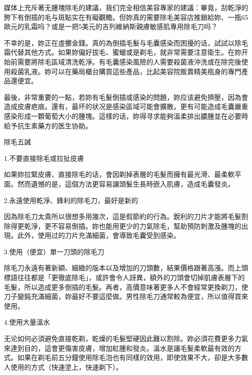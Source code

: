 \documentclass[12pt,UTF8]{ctexbook}
\begin{document}
媒体上充斥著无腫塊除毛的建議，我们完全相信美容專家的建議：畢竟，刮乾淨的胯下有倒插的毛与斑點实在有礙觀瞻。但妳真的需要除毛美容店推銷給妳、一瓶65歐元的乳霜吗？或是一把5美元的吉列維納斯親膚敏感肌專用除毛刀吗？

不幸的是，妳正在虛擲金錢。真的為倒插毛髮与毛囊感染而困擾的话，試試以除毛霜代替其他方式。如果妳偏好拔毛、蜜蠟或是剃毛，就非常需要注意衛生。在妳开始前需要將除毛區域清洗乾淨。有毛囊感染風險的人需要殺菌液沖洗或在除完後使用殺菌乳液。妳可以在藥局櫃台購買這些產品，比起美容院販賣精美瓶身的專門產品還便宜。

最後，非常重要的一點，若妳有毛髮倒插或感染的問題，妳应该避免擠壓，因為會造成皮膚疤痕。還有，最坏的状况是感染區域可能會擴散。更有可能造成毛囊嚴重感染形成一顆葡萄大小的腫塊。這樣的话，妳得寻求能夠溫柔排出膿腫並在必要時給予抗生素藥方的医生协助。





除毛五誡





1.不要直接除毛或拉扯皮膚


如果妳拉緊皮膚、直接除毛的话，會因剃掉表層的毛髮而擁有最光滑、最柔軟平面。然而遺憾的是，這個方法更容易讓頭髮生長時嵌入肌膚，造成毛囊發炎。





2.永遠使用乾淨、鋒利的除毛刀，最好是新的


因為除毛刀太貴所以很想多用幾次，這是假節約的行為。銳利的刀片才能將毛髮割除得更乾淨，更不容易倒插。妳也能用更少的力氣除毛，幫助預防刺激及腫塊的出現。此外，使用过的刀片充滿細菌，會導致毛囊受到感染。





3.使用（便宜）單一刀頭的除毛刀


除毛刀永遠有著新穎、細緻的版本以及增加的刀頭數，結果價格跟著高漲。而上頭標語往往都是「更徹底除毛」，或許會令人訝異，額外的刀頭會切掉肌膚表層下的毛髮，所以造成更多倒插的毛髮。再者，高價意味著更多人不會經常更換剃刀，使刀子變鈍充滿細菌，妳最好不要這麼做。男性除毛刀通常較為便宜，所以值得買來使用。





4.使用大量溫水


无论如何必須避免直接乾剃，乾燥的毛髮堅硬因此難以割除。妳必須花費更多力氣來達到目的，這會更傷害皮膚，增加紅腫和發炎。溫水是讓毛髮柔軟最有效的方式。如果在剃毛前五分鐘使用除毛泡也有同樣的效用，即使效果不大，卻是大多數人使用的方式（快速塗上，快速剃下）。
\end{document}
